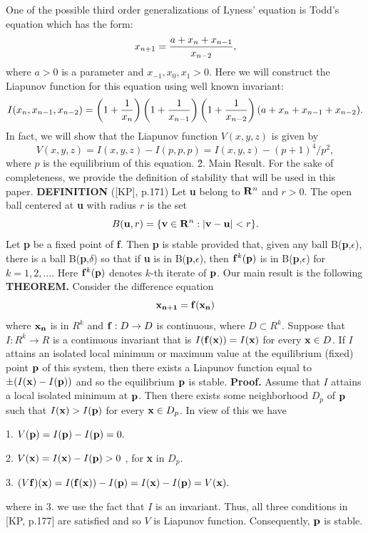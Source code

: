One of the possible third order generalizations of Lyness' equation is Todd's
equation which has the form:
$$x_{n+1}={{a + x_n + x_{n-1}}\over x_{n-2}},$$
where $a>0$ is a parameter and $x_{-1}, x_0, x_1>0$.
Here we will construct the Liapunov function for this equation using well
known invariant:
$$I(x_n,x_{n-1},x_{n-2})=\left(1+{1\over x_n}\right)\left(1+{1\over x_{n-1}}\right)\left(1+{1\over x_{n-2}}\right)(a+x_n+x_{n-1}+x_{n-2}).$$
In fact, we will show that the Liapunov function $V(x,y,z)$ is given by
$$V(x,y,z)=I(x,y,z)-I(p,p,p)=I(x,y,z)-{(p+1)^4/p^2},$$
where $p$ is the equilibrium of this equation.
\bigskip
\vfill\eject
{\r 2. Main Result. }
\bigskip
For the sake of completeness, we provide the definition of
stability that will be used in this paper.
\medskip
{\bf DEFINITION} ([KP], p.171) Let {\bf u} belong to ${\bf R}^n$ and $r>0$. The open
ball centered at {\bf u} with radius $r$ is the set
$$B({\bf u},r) = \{{\bf v} \in {\bf R}^n: |{\bf v} - {\bf u}|<r\}.$$
Let {\bf p} be a fixed point of {\bf f}. Then {\bf p} is stable provided that,
given any ball B({\bf p},$\epsilon$), there is a ball B({\bf p},$\delta$) so that
if {\bf u} is in B({\bf p},$\epsilon$), then ${\bf f}^k ({\bf p })$ is in B({\bf p},$\epsilon$)
for $k=1,2,...$. Here ${\bf f}^k ({\bf p })$ denotes $k$-th iterate of ${\bf p}$.
\medskip
Our main result is the following
\bigskip
{\bf THEOREM.} Consider the  difference equation
$${\bf x_{n+1}}={\bf f( x_n)}$$
where ${\bf x_n}$ is in $R^k$ and ${\bf f}: D\to D$ is continuous, where
$D \subset R^k$. Suppose that $I:R^k\to R$ is a continuous invariant that is
$I({\bf f(x)})=I({\bf x})$
for every ${\bf x}\in D$. If $I$ attains an isolated local minimum or maximum value
at the equilibrium (fixed) point ${\bf p}$  of this system, then there exists a
Liapunov function equal to  $\pm(I({\bf x}) - I({\bf p}))$ and so the equilibrium
${\bf p}$ is stable.
\medskip
{\bf Proof.} Assume that $I$ attains a local isolated minimum at ${\bf p}$. Then there
exists some neighborhood $D_p$ of $\bf p$ such that $I({\bf x})>I({\bf p})$ for
every ${\bf x}\in D_p$. In view of this we have

1. $V({\bf p}) = I({\bf p})  - I({\bf p}) = 0.$

2. $V({\bf x}) = I({\bf x}) - I({\bf p}) > 0$ , for {\bf x} in $D_p $.

3. $(V {\bf f})({\bf x}) = I({\bf f({\bf x})}) - I({\bf p}) = I({\bf x}) - I({\bf p}) = V({\bf x}).$

where in 3. we use the fact that $I$ is an invariant. Thus, all three conditions
in [KP, p.177] are satisfied and so $V$ is Liapunov function. Consequently,
${\bf p}$ is stable.

